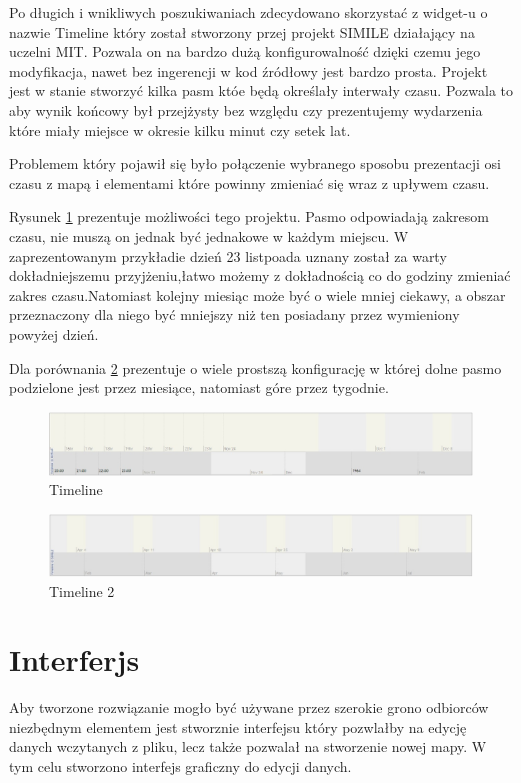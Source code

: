 Po długich i wnikliwych poszukiwaniach zdecydowano skorzystać z widget-u o nazwie Timeline który został stworzony przej projekt SIMILE działający na uczelni MIT. Pozwala on na bardzo dużą konfigurowalność dzięki czemu jego modyfikacja, nawet bez ingerencji w kod źródłowy jest bardzo prosta.
Projekt jest w stanie stworzyć kilka pasm któe będą określały interwały czasu. Pozwala to aby wynik końcowy był przejżysty bez względu czy prezentujemy wydarzenia które miały miejsce w okresie kilku minut czy setek lat.

Problemem który pojawił się było połączenie wybranego sposobu prezentacji osi czasu z mapą i elementami które powinny zmieniać się wraz z upływem czasu.

Rysunek \ref{fig:tm1} prezentuje możliwości tego projektu. Pasmo odpowiadają zakresom czasu, nie muszą on jednak być jednakowe w każdym miejscu. W zaprezentowanym przykładie dzień 23 listpoada uznany został za warty dokładniejszemu przyjżeniu,łatwo możemy z dokładnością co do godziny zmieniać zakres czasu.Natomiast kolejny miesiąc może być o wiele mniej ciekawy, a obszar przeznaczony dla niego być mniejszy niż ten posiadany przez wymieniony powyżej dzień.

Dla porównania \ref{fig:tm2} prezentuje o wiele prostszą konfigurację w której dolne pasmo podzielone jest przez miesiące, natomiast góre przez tygodnie.

  \begin{figure}[H]
  \centering
    \includegraphics[width=150mm]{ge/tm1.jpg}
  \caption{Timeline}
  \label{fig:tm1}
\end{figure}

  \begin{figure}[H]
  \centering
    \includegraphics[width=150mm]{ge/tm2.jpg}
  \caption{Timeline 2}
  \label{fig:tm2}
\end{figure}

\section{Interferjs}
\label{sec:Interferjs}

Aby tworzone rozwiązanie mogło być używane przez szerokie grono odbiorców niezbędnym elementem jest stworznie interfejsu który pozwlałby na edycję danych wczytanych z pliku, lecz także pozwalał na stworzenie nowej mapy. W tym celu stworzono interfejs graficzny do edycji danych.
